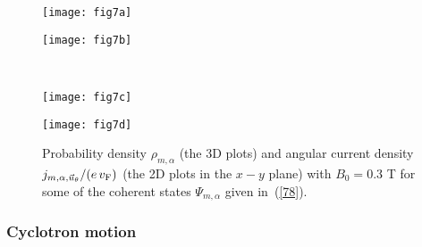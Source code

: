 \documentclass[aps,showpacs,showkeys]{revtex4}
\begin{document}
\begin{figure}[htb]
	\centering
	\begin{minipage}[b]{0.33\textwidth}
		\texttt{[image: fig7a]}\\
		\label{fig:rho_alpha1_ii}
	\end{minipage}
\hspace{3cm}
	\begin{minipage}[b]{0.33\textwidth}
		\texttt{[image: fig7b]}\\
		\label{fig:jrho_alpha1_ii}
	\end{minipage}
\\ [2ex]
	\begin{minipage}[b]{0.33\textwidth}
		\texttt{[image: fig7c]}\\
		\label{fig:jtheta_alpha1_ii}
	\end{minipage}
\hspace{3cm}
\begin{minipage}[b]{0.33\textwidth} %
	\texttt{[image: fig7d]}\\
	\label{fig:jtheta_alpha1_ii}
\end{minipage}
	\caption{\label{fig:rho_alpha2} Probability density $\rho_{m,\alpha}$ (the 3D plots) and angular current density $j_{m,\alpha ,\vec{u}_{\theta}}/(e\,v_{\rm F})$ (the 2D plots in the $x-y$ plane) with $B_{0}=0.3$ T for some of the coherent states $\Psi_{m,\alpha}$ given in~(\ref{78}).}
\end{figure}




\subsubsection{Cyclotron motion}
\end{document}
